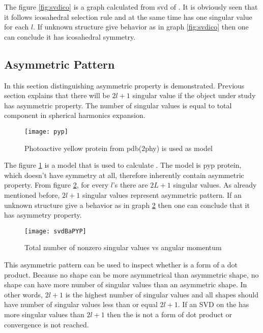 The figure \ref{fig:svdico} is a graph calculated from svd of \Blq. It is obviously seen that it follows icosahedral selection rule and at the same time has one singular value for each $l$. If unknown structure give behavior as in graph \ref{fig:svdico} then one can conclude it has icosahedral symmetry.   
\subsection{Asymmetric Pattern}
In this section distinguishing  asymmetric property is demonstrated. Previous section explains that there will be $2l+1$ singular value if the object under study has asymmetric property. The number of singular values is equal to total component in spherical harmonics expansion. 
\begin{figure}[h!]
  \centering
  \texttt{[image: pyp]}
\caption{Photoactive yellow protein from pdb(2phy) is used as model}
\label{fig:pyp}
\end{figure}

The figure \ref{fig:pyp} is a model that is used to calculate \Blq. The model is pyp protein, which doesn't have symmetry at all, therefore \Blq inherently contain asymmetric property. From figure \ref{fig:svdPYP}, for every $l$'s there are $2L+1$ singular values. As already mentioned before, $2l+1$ singular values represent asymmetric pattern. If an unknown structure give a behavior as in graph \ref{fig:svdPYP} then one can conclude that it has asymmetry property.   
\begin{figure}[h!]
  \centering
  \texttt{[image: svdBaPYP]}
\caption{Total number of nonzero singular values vs angular momentum}
\label{fig:svdPYP}
\end{figure}

This asymmetric pattern can be used to inspect whether \Blq is a form of a dot product. Because no shape can be more asymmetrical than asymmetric shape, no shape can have more number of singular values than an asymmetric shape. In other words, $2l+1$ is the highest number of singular values and all shapes should have number of singular values less than or equal $2l+1$. If an SVD on the \Blq has more singular values than $2l+1$ then the \Blq is not a form of dot product or convergence is not reached.  


